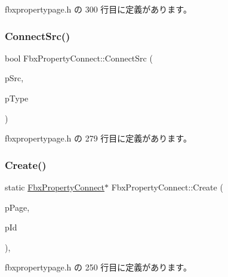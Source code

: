  fbxpropertypage.\+h の 300 行目に定義があります。

\mbox{\label{class_fbx_property_connect_af5c78b8a65708e2e4f82da4db2deb76a}} 
\subsubsection{\texorpdfstring{Connect\+Src()}{ConnectSrc()}}
{\footnotesize\ttfamily bool Fbx\+Property\+Connect\+::\+Connect\+Src (\begin{DoxyParamCaption}\item[{\hyperlink{class_fbx_property_connect}{Fbx\+Property\+Connect} $\ast$}]{p\+Src,  }\item[{\hyperlink{class_fbx_connection_a3df448a5db356652ab99fd2be2553749}{Fbx\+Connection\+::\+E\+Type}}]{p\+Type }\end{DoxyParamCaption})\hspace{0.3cm}{\ttfamily [inline]}}



 fbxpropertypage.\+h の 279 行目に定義があります。

\mbox{\label{class_fbx_property_connect_aa9dc912c6e7b5185f0afa7af81c55e85}} 
\subsubsection{\texorpdfstring{Create()}{Create()}}
{\footnotesize\ttfamily static \hyperlink{class_fbx_property_connect}{Fbx\+Property\+Connect}$\ast$ Fbx\+Property\+Connect\+::\+Create (\begin{DoxyParamCaption}\item[{\hyperlink{class_fbx_property_page}{Fbx\+Property\+Page} $\ast$}]{p\+Page,  }\item[{\hyperlink{fbxtypes_8h_a088fa96de3b0b3ea69f0f6afef525dfb}{Fbx\+Int}}]{p\+Id }\end{DoxyParamCaption})\hspace{0.3cm}{\ttfamily [inline]}, {\ttfamily [static]}}



 fbxpropertypage.\+h の 250 行目に定義があります。

